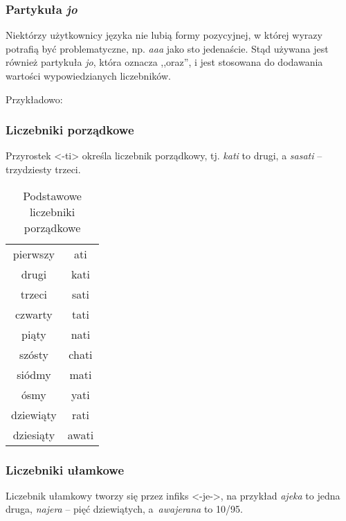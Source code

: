 \begin{spacing}{1.1}
\subsubsection{Partykuła \emph{jo}}

Niektórzy użytkownicy języka nie lubią formy pozycyjnej, w której wyrazy potrafią
być problematyczne, np. \emph{aaa} jako sto jedenaście. Stąd używana jest również
partykuła \emph{jo}, która oznacza ,,oraz'', i jest stosowana do dodawania
wartości wypowiedzianych liczebników.

Przykładowo:




\subsubsection{Liczebniki porządkowe}

Przyrostek <-ti> określa liczebnik porządkowy, tj. \emph{kati} to drugi, 
a \emph{sasati} -- trzydziesty trzeci.

\begin{table}[h]
\centering
\caption{Podstawowe liczebniki porządkowe}
\begin{tabular}{cc} \toprule
	pierwszy & ati \\
	drugi & kati \\
	trzeci & sati \\
	czwarty & tati \\
	piąty & nati \\
	szósty & chati \\
	siódmy & mati \\
	ósmy & yati \\
	dziewiąty & rati \\
	dziesiąty & awati \\\bottomrule
\end{tabular}
\label{tab:chars}
\end{table}

\subsubsection{Liczebniki ułamkowe}

Liczebnik ułamkowy tworzy się przez infiks <-je->, na przykład \emph{ajeka} to 
jedna druga, \emph{najera} -- pięć dziewiątych, a~\emph{awajerana} to 10/95.


\end{spacing}
